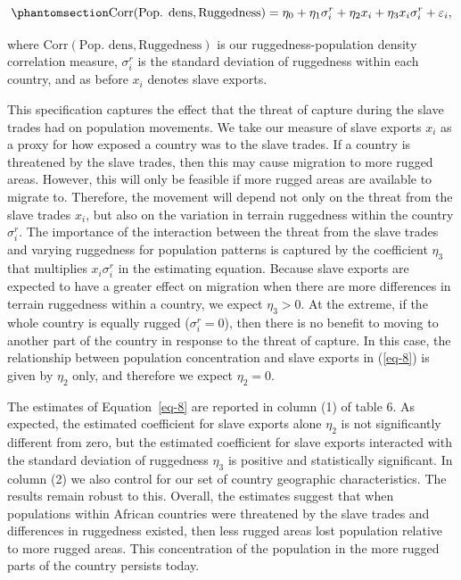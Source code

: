 \documentclass[
  letterpaper,
  DIV=11,
  numbers=noendperiod]{scrartcl}
\begin{document}
\begin{equation}\phantomsection\label{eq-8}{
\text{Corr}(\text{Pop. dens}, \text{Ruggedness}) = \eta_0 + \eta_1 \sigma_i^r + \eta_2 x_i + \eta_3 x_i \sigma_i^r + \varepsilon_i,
}\end{equation}

where \(\text{Corr}(\text{Pop. dens}, \text{Ruggedness})\) is our
ruggedness-population density correlation measure, \(\sigma^r_i\) is the
standard deviation of ruggedness within each country, and as before
\(x_i\) denotes slave exports.

This specification captures the effect that the threat of capture during
the slave trades had on population movements. We take our measure of
slave exports \(x_i\) as a proxy for how exposed a country was to the
slave trades. If a country is threatened by the slave trades, then this
may cause migration to more rugged areas. However, this will only be
feasible if more rugged areas are available to migrate to. Therefore,
the movement will depend not only on the threat from the slave trades
\(x_i\), but also on the variation in terrain ruggedness within the
country \(\sigma^r_i\). The importance of the interaction between the
threat from the slave trades and varying ruggedness for population
patterns is captured by the coefficient \(\eta_3\) that multiplies
\(x_i \sigma^r_i\) in the estimating equation. Because slave exports are
expected to have a greater effect on migration when there are more
differences in terrain ruggedness within a country, we expect
\(\eta_3 > 0\). At the extreme, if the whole country is equally rugged
(\(\sigma^r_i = 0\)), then there is no benefit to moving to another part
of the country in response to the threat of capture. In this case, the
relationship between population concentration and slave exports in
(\ref{eq-8}) is given by \(\eta_2\) only, and therefore we expect
\(\eta_2 = 0\).

The estimates of Equation~\ref{eq-8} are reported in column (1) of table
6. As expected, the estimated coefficient for slave exports alone
\(\eta_2\) is not significantly different from zero, but the estimated
coefficient for slave exports interacted with the standard deviation of
ruggedness \(\eta_3\) is positive and statistically significant. In
column (2) we also control for our set of country geographic
characteristics. The results remain robust to this. Overall, the
estimates suggest that when populations within African countries were
threatened by the slave trades and differences in ruggedness existed,
then less rugged areas lost population relative to more rugged areas.
This concentration of the population in the more rugged parts of the
country persists today.
\end{document}
